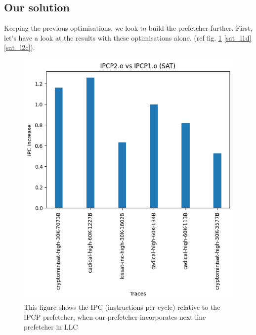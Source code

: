 \documentclass[conference]{IEEEtran}
\begin{document}
\subsection{Our solution}
Keeping the previous optimisations, we look to build the prefetcher further. First, let's have a look at the results with these optimisations alone. (ref fig. \ref{sat_ipc} \ref{sat_l1d} \ref{sat_l2c}).

\begin{figure}
\includegraphics[scale=0.5]{Images/Bingo/sat_ipc.png}
\caption{This figure shows the IPC (instructions per cycle) relative to the IPCP prefetcher, when our prefetcher incorporates next line prefetcher in LLC}
\label{sat_ipc}
\end{figure}
\end{document}
